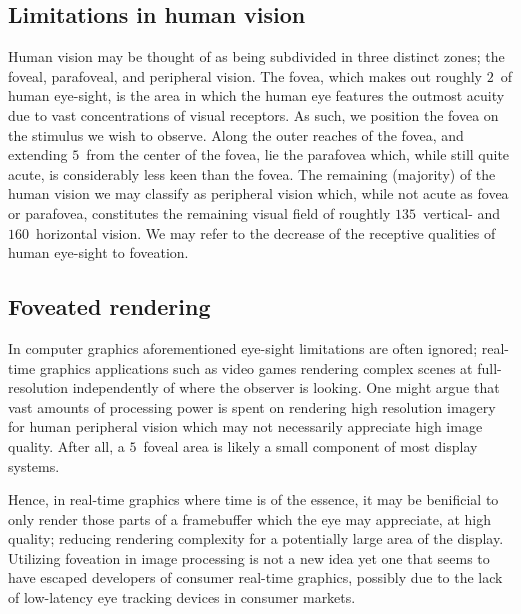 \subsection{Limitations in human vision}
Human vision may be thought of as being subdivided in three distinct zones; the foveal, parafoveal, and peripheral vision\cite{rayner98}.
The fovea, which makes out roughly $2$\degree\ of human eye-sight, is the area in which the human eye features the outmost acuity due to vast concentrations of visual receptors.
As such, we position the fovea on the stimulus we wish to observe.
Along the outer reaches of the fovea, and extending $5$\degree\ from the center of the fovea, lie the parafovea which, while still quite acute, is considerably less keen than the fovea.
The remaining (majority) of the human vision we may classify as peripheral vision which, while not acute as fovea or parafovea, constitutes the remaining visual field of roughtly $135$\degree\ vertical- and $160$\degree\ horizontal vision\cite{guenter12}.
We may refer to the decrease of the receptive qualities of human eye-sight to foveation.

\subsection{Foveated rendering}
In computer graphics aforementioned eye-sight limitations are often ignored; real-time graphics applications such as video games rendering complex scenes at full-resolution independently of where the observer is looking.
One might argue that vast amounts of processing power is spent on rendering high resolution imagery for human peripheral vision which may not necessarily appreciate high image quality.
After all, a $5$\degree\ foveal area is likely a small component of most display systems.

Hence, in real-time graphics where time is of the essence, it may be benificial to only render those parts of a framebuffer which the eye may appreciate, at high quality; reducing rendering complexity for a potentially large area of the display.
Utilizing foveation in image processing is not a new idea\cite{levoy90} yet one that seems to have escaped developers of consumer real-time graphics, possibly due to the lack of low-latency eye tracking devices in consumer markets.
